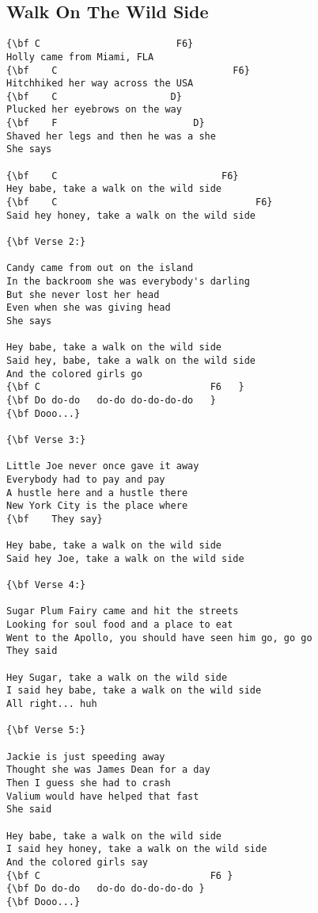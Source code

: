\documentclass[a4paper]{article}
\begin{document}
\subsection{Walk On The Wild Side} %
\label{sub:Walk On The Wild Side}
\begin{multicols}{2}
\begin{Verbatim}[commandchars=\\\{\}]
{\bf C                        F6}
Holly came from Miami, FLA
{\bf 	C                               F6}
Hitchhiked her way across the USA
{\bf 	C                    D}
Plucked her eyebrows on the way
{\bf 	F                        D}
Shaved her legs and then he was a she
She says

{\bf 	C                             F6}
Hey babe, take a walk on the wild side
{\bf 	C                                   F6}
Said hey honey, take a walk on the wild side

{\bf Verse 2:}

Candy came from out on the island
In the backroom she was everybody's darling
But she never lost her head
Even when she was giving head
She says

Hey babe, take a walk on the wild side
Said hey, babe, take a walk on the wild side
And the colored girls go
{\bf C                              F6   }
{\bf Do do-do   do-do do-do-do-do   }
{\bf Dooo...}

{\bf Verse 3:}

Little Joe never once gave it away
Everybody had to pay and pay
A hustle here and a hustle there
New York City is the place where
{\bf 	They say}

Hey babe, take a walk on the wild side
Said hey Joe, take a walk on the wild side

{\bf Verse 4:}

Sugar Plum Fairy came and hit the streets
Looking for soul food and a place to eat
Went to the Apollo, you should have seen him go, go go
They said

Hey Sugar, take a walk on the wild side
I said hey babe, take a walk on the wild side
All right... huh

{\bf Verse 5:}

Jackie is just speeding away
Thought she was James Dean for a day
Then I guess she had to crash
Valium would have helped that fast
She said

Hey babe, take a walk on the wild side
I said hey honey, take a walk on the wild side
And the colored girls say
{\bf C                              F6 }
{\bf Do do-do   do-do do-do-do-do }
{\bf Dooo...}
\end{Verbatim}
\end{multicols}
\end{document}
